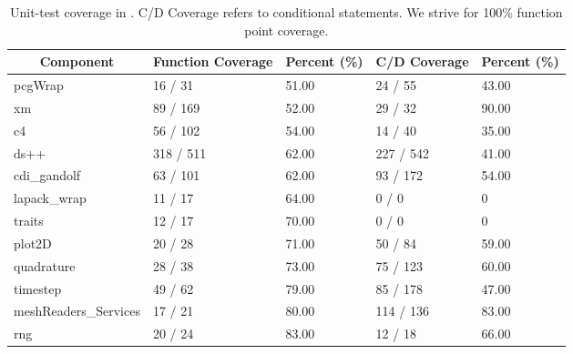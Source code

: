 

\begin{table}
  \caption{
    Unit-test coverage in \dracor.  C/D Coverage refers to conditional
    statements.  We strive for 100\% function point coverage.  
  }
  \label{tab:coverage}
  \begin{center}
    \begin{tabular}{lllll}\hline\hline
      \multicolumn{1}{c}{Component} &
      \multicolumn{1}{c}{Function Coverage} &
      \multicolumn{1}{c}{Percent (\%)} &
      \multicolumn{1}{c}{C/D Coverage} &
      \multicolumn{1}{c}{Percent (\%)} \\\hline
      pcgWrap       &       16      /       31      &       51.00   &       24      /       55      &       43.00   \\
      xm     &       89      /       169     &       52.00   &       29      /       32      &       90.00   \\
      c4     &       56      /       102     &       54.00   &       14      /       40      &       35.00   \\
      ds++   &       318     /       511     &       62.00   &       227     /       542     &       41.00   \\
      cdi\_gandolf    &       63      /       101     &       62.00   &       93      /       172     &       54.00   \\
      lapack\_wrap    &       11      /       17      &       64.00   &       0       /       0       &       0       \\
      traits &       12      /       17      &       70.00   &       0       /       0       &       0       \\
      plot2D &       20      /       28      &       71.00   &       50      /       84      &       59.00   \\
      quadrature     &       28      /       38      &       73.00   &       75      /       123     &       60.00   \\
      timestep      &       49      /       62      &       79.00   &       85      /       178     &       47.00   \\
      meshReaders\_Services   &       17      /       21      &       80.00   &       114     /       136     &       83.00   \\
      rng    &       20      /       24      &       83.00   &       12      /       18      &       66.00   \\

\end{tabular}
\end{center}
\end{table}
